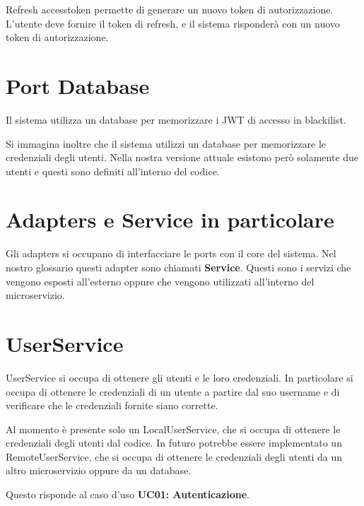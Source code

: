 Refresh accesstoken permette di generare un nuovo token di autorizzazione. L'utente deve fornire il token di refresh, e il sistema risponderà con un nuovo token di autorizzazione.

\section{Port Database}

Il sistema utilizza un database per memorizzare i JWT di accesso in blackilist.

Si immagina inoltre che il sistema utilizzi un database per memorizzare le credenziali degli utenti. Nella nostra versione attuale esistono però solamente due utenti e questi sono definiti all'interno del codice.




\section{Adapters e Service in particolare}

Gli adapters si occupano di interfacciare le ports con il core del sistema. Nel nostro glossario questi adapter sono chiamati \textbf{Service}. Questi sono i servizi che vengono esposti all'esterno oppure che vengono utilizzati all'interno del microservizio.

\section{UserService}

UserService si occupa di ottenere gli utenti e le loro credenziali. In particolare si occupa di ottenere le credenziali di un utente a partire dal suo username e di verificare che le credenziali fornite siano corrette.

Al momento è presente solo un LocalUserService, che si occupa di ottenere le credenziali degli utenti dal codice. In futuro potrebbe essere implementato un RemoteUserService, che si occupa di ottenere le credenziali degli utenti da un altro microservizio oppure da un database.

Questo risponde al caso d'uso \textbf{UC01: Autenticazione}.

